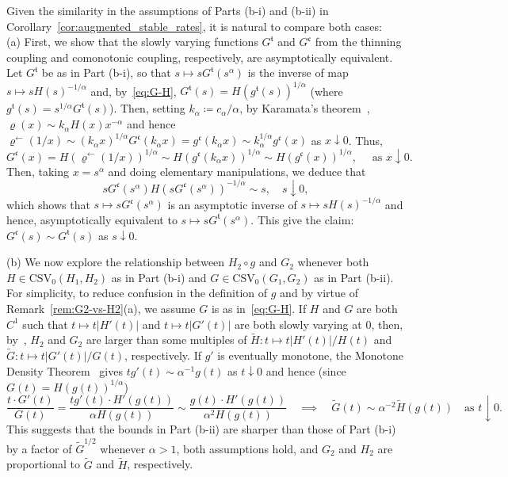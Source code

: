 \documentclass[en,oneside,bbfont,article]{amsart}
\theoremstyle{remark}
\newenvironment{remark}
    {\pushQED{\qed}\renewcommand{\qedsymbol}{$\Diamond$}\remarkx}
    {\popQED\endremarkx}
\theoremstyle{definition}
\theoremstyle{definition}
\newcommand\1{\mathds{1}}
\newcommand\CSV{\mathrm{CSV}}
\newcommand\da{\downarrow}
\newcommand\la{\leftarrow}
\newcommand{\wt}[1]{\widetilde{#1}}
\newcommand{\mft}{{\mathfrak{t}}}
\newcommand{\mfc}{{\mathfrak{c}}}
\begin{document}
\begin{remark}
\label{rem:G2-vs-H2}
Given the similarity in the assumptions of Parts (b-i) and (b-ii) in Corollary~\ref{cor:augmented_stable_rates}, it is natural to compare both cases:\\
(a) First, we show that the slowly varying functions $G^\mft$ and $G^\mfc$ from the thinning coupling and comonotonic coupling, respectively, are asymptotically equivalent. Let $G^\mft$ be as in Part (b-i), so that $s\mapsto sG^\mft(s^\alpha)$ is the inverse of map $s\mapsto sH(s)^{-1/\alpha}$ and, by~\eqref{eq:G-H}, $G^\mft(s)=H(g^\mft(s))^{1/\alpha}$ (where $g^\mft(s)=s^{1/\alpha}G^\mft(s)$). Then, setting $k_\alpha\coloneqq c_\alpha/\alpha$, by Karamata's theorem~\cite[Thm~1.5.11]{MR1015093}, $\varrho(x)\sim k_\alpha H(x)x^{-\alpha}$ and hence $\varrho^\la(1/x)\sim (k_\alpha x)^{1/\alpha}G^\mfc(k_\alpha x)=g^\mfc(k_\alpha x)\sim k_\alpha^{1/\alpha}g^\mfc(x)$ as $x\da 0$. Thus, 
\[
G^\mfc(x)
=H(\varrho^\la(1/x))^{1/\alpha}
\sim H(g^\mfc(k_\alpha x))^{1/\alpha}
\sim H(g^\mfc(x))^{1/\alpha}, 
\quad \text{ as }x \da 0.
\]
Then, taking $x=s^\alpha$ and doing elementary manipulations, we deduce that
\[
s G^\mfc(s^\alpha)H(s G^\mfc(s^\alpha))^{-1/\alpha}
\sim s,\quad s\da 0,
\]
which shows that $s\mapsto s G^\mfc(s^\alpha)$ is an asymptotic inverse of $s\mapsto sH(s)^{-1/\alpha}$ and hence, asymptotically equivalent to $s\mapsto s G^\mft(s^\alpha)$. This give the claim: $G^\mfc(s)\sim G^\mft(s)$ as $s\da 0$.

(b) We now explore the relationship between $H_2\circ g$ and $G_2$ whenever both $H\in\CSV_0(H_1,H_2)$ as in Part (b-i) and $G\in\CSV_0(G_1,G_2)$ as in Part (b-ii). For simplicity, to reduce confusion in the definition of $g$ and by virtue of Remark~\ref{rem:G2-vs-H2}(a), we assume $G$ is as in~\eqref{eq:G-H}. If $H$ and $G$ are both $C^1$ such that $t\mapsto t|H'(t)|$ and $t\mapsto t|G'(t)|$ are both slowly varying at $0$, then, by~\cite[Lem.~6.1]{WassersteinPaper}, $H_2$ and $G_2$ are larger than some multiples of $\wt H:t\mapsto t|H'(t)|/H(t)$ and $\wt G:t\mapsto t|G'(t)|/G(t)$, respectively. If $g'$ is eventually monotone, the Monotone Density Theorem~\cite[Thm~1.7.2]{MR1015093} gives $t g'(t)\sim \alpha^{-1}g(t)$ as $t\da0$ and hence (since $G(t)=H(g(t))^{1/\alpha}$) 
\[
\frac{t\cdot G'(t)}{G(t)}
=\frac{tg'(t)\cdot H'(g(t))}{\alpha H(g(t))}
\sim \frac{g(t)\cdot H'(g(t))}{\alpha^2 H(g(t))}
\quad\implies\quad
\wt G(t)\sim \alpha^{-2}\wt H(g(t))
\quad\text{as }t\da 0.
\]
This suggests that the bounds in Part (b-ii) are sharper than those of Part (b-i) by a factor of $\wt G^{1/2}$ whenever $\alpha>1$, both assumptions hold, and $G_2$ and $H_2$ are proportional to $\wt G$ and $\wt H$, respectively.
\end{remark}
\end{document}
